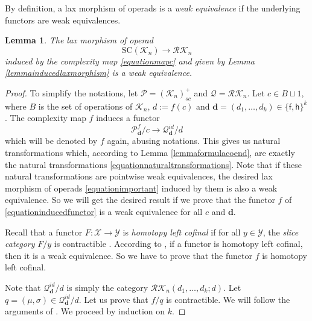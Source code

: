 \documentclass[]{amsart}
\newtheorem{lemma}[theorem]{Lemma}
\theoremstyle{definition}
\begin{document}
By definition, a lax morphism of operads is a \emph{weak equivalence} if the underlying functors are weak equivalences.

\begin{lemma}\label{lemmatechnical}
	The lax morphism of operad
	\begin{equation}\label{equationimportant}
		\mathrm{SC}(\mathcal{K}_n) \to \mathcal{RK}_n
	\end{equation}
	induced by the complexity map \eqref{equationmapc} and given by Lemma \ref{lemmainducedlaxmorphism} is a weak equivalence.
\end{lemma}

\begin{proof}
	To simplify the notations, let $\mathcal{P}=(\mathcal{K}_n)_{sc}^+$ and $\mathcal{Q}=\mathcal{RK}_n$. Let $c \in B \sqcup 1$, where $B$ is the set of operations of $\mathcal{K}_n$, $d := f(c)$ and $\mathbf{d} = (d_1,\ldots,d_k) \in \{\mathsf{f},\mathsf{h}\}^k$. The complexity map $f$ induces a functor
	\begin{equation}\label{equationinducedfunctor}
		\mathcal{P}_\mathbf{d}^f/c \to \mathcal{Q}_\mathbf{d}^{id}/d
	\end{equation}
	which will be denoted by $f$ again, abusing notations. This gives us natural transformations which, according to Lemma \ref{lemmaformulacoend}, are exactly the natural transformations \eqref{equationnaturaltransformations}. Note that if these natural transformations are pointwise weak equivalences, the desired lax morphism of operads \eqref{equationimportant} induced by them is also a weak equivalence. So we will get the desired result if we prove that the functor $f$ of \eqref{equationinducedfunctor} is a weak equivalence for all $c$ and $\mathbf{d}$.
	
	Recall that a functor $F: \mathcal{X} \to \mathcal{Y}$ is \emph{homotopy left cofinal} if for all $y \in \mathcal{Y}$, the \emph{slice category} $F/y$ is contractible \cite[Definition 19.6.1]{hirschhorn}. According to \cite[Theorem A]{quillenthma}, if a functor is homotopy left cofinal, then it is a weak equivalence. So we have to prove that the functor $f$ is homotopy left cofinal.
	
	Note that $\mathcal{Q}_\mathbf{d}^{id}/d$ is simply the category $\mathcal{RK}_n(d_1,\ldots,d_k;d)$. Let $q = (\mu,\sigma) \in \mathcal{Q}_\mathbf{d}^{id}/d$. Let us prove that $f/q$ is contractible. We will follow the arguments of \cite[Lemma 3.4]{delegergregocondensation}. We proceed by induction on $k$.
	

\end{proof}
\end{document}
